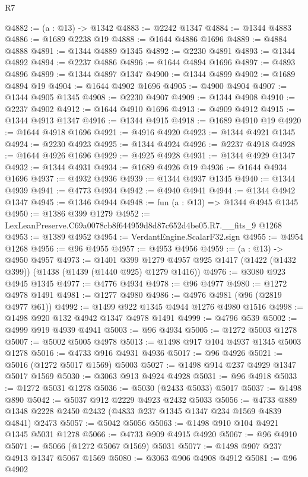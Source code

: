 \begin{lexlean}{R7}
\begin{coremodule}
@4882 := (a : @13) -> @1342
@4883 := @2242 @1347
@4884 := @1344 @4883
@4886 := @1689 @2238 @19
@4888 := @1644 @4886 @1696
@4889 := @4884 @4888
@4891 := @1344 @4889 @1345
@4892 := @2230 @4891
@4893 := @1344 @4892
@4894 := @2237 @4886
@4896 := @1644 @4894 @1696
@4897 := @4893 @4896
@4899 := @1344 @4897 @1347
@4900 := @1344 @4899
@4902 := @1689 @4894 @19
@4904 := @1644 @4902 @1696
@4905 := @4900 @4904
@4907 := @1344 @4905 @1345
@4908 := @2230 @4907
@4909 := @1344 @4908
@4910 := @2237 @4902
@4912 := @1644 @4910 @1696
@4913 := @4909 @4912
@4915 := @1344 @4913 @1347
@4916 := @1344 @4915
@4918 := @1689 @4910 @19
@4920 := @1644 @4918 @1696
@4921 := @4916 @4920
@4923 := @1344 @4921 @1345
@4924 := @2230 @4923
@4925 := @1344 @4924
@4926 := @2237 @4918
@4928 := @1644 @4926 @1696
@4929 := @4925 @4928
@4931 := @1344 @4929 @1347
@4932 := @1344 @4931
@4934 := @1689 @4926 @19
@4936 := @1644 @4934 @1696
@4937 := @4932 @4936
@4939 := @1344 @4937 @1345
@4940 := @1344 @4939
@4941 := @4773 @4934
@4942 := @4940 @4941
@4944 := @1344 @4942 @1347
@4945 := @1346 @4944
@4948 := fun (a : @13) => @1344 @4945 @1345
@4950 := @1386 @399 @1279
@4952 := LexLeanPreserve.C69a0078cb8f644959d8d87c652d4be05.R7.__fits_9 @1268
@4953 := @1389 @4952
@4954 := VerdantEngine.ScalarF32.sign
@4955 := @4954 @1268
@4956 := @96 @4955
@4957 := @4953 @4956
@4959 := (a : @13) -> @4950 @4957
@4973 := @1401
    @399
    @1279
    @4957
    @925
    @1417
    (@1422 (@1432 @399))
    (@1438 (@1439 (@1440 @925) @1279 @1416))
@4976 := @3080 @923 @4945 @1345
@4977 := @4776 @4934
@4978 := @96 @4977
@4980 := @1272 @4978 @1491
@4981 := @1277 @4980
@4986 := @4976 @4981 (@96 (@2819 @4977 @61))
@4992 := @1499 @922 @1345 @4944 @1276 @4980 @1516
@4998 := @1498 @920 @132 @4942 @1347 @4978 @1491
@4999 := @4796 @539
@5002 := @4999 @919 @4939 @4941
@5003 := @96 @4934
@5005 := @1272 @5003 @1278
@5007 := @5002 @5005 @4978
@5013 := @1498 @917 @104 @4937 @1345 @5003 @1278
@5016 := @4733 @916 @4931 @4936
@5017 := @96 @4926
@5021 := @5016 (@1272 @5017 @1569) @5003
@5027 := @1498 @914 @237 @4929 @1347 @5017 @1569
@5030 := @3063 @913 @4924 @4928
@5031 := @96 @4918
@5033 := @1272 @5031 @1278
@5036 := @5030 (@2433 @5033) @5017
@5037 := @1498 @890
@5042 := @5037 @912 @2229 @4923 @2432 @5033
@5056 := @4733 @889 @1348 @2228 @2450 @2432 (@4833 @237 @1345 @1347 @234 @1569 @4839 @4841) @2473
@5057 := @5042 @5056
@5063 := @1498 @910 @104 @4921 @1345 @5031 @1278
@5066 := @4733 @909 @4915 @4920
@5067 := @96 @4910
@5071 := @5066 (@1272 @5067 @1569) @5031
@5077 := @1498 @907 @237 @4913 @1347 @5067 @1569
@5080 := @3063 @906 @4908 @4912
@5081 := @96 @4902

\end{coremodule}
\end{lexlean}
